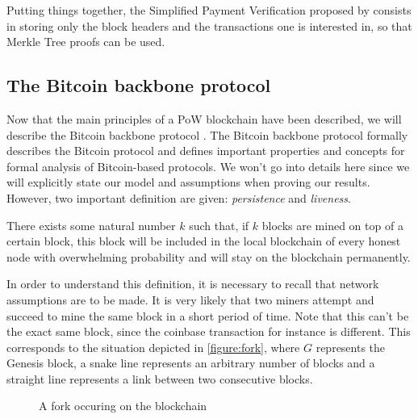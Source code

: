         Putting things together, the Simplified Payment Verification proposed by \citeauthor{Bitcoin} consists in storing only the block headers and the transactions one is interested in, so that Merkle Tree proofs can be used.

      \subsection{The Bitcoin backbone protocol}
        \label{subsec:backbone}
        Now that the main principles of a PoW blockchain have been described, we will describe the Bitcoin backbone protocol \cite{Backbone}. The Bitcoin backbone protocol formally describes the Bitcoin protocol and defines important properties and concepts for formal analysis of Bitcoin-based protocols. We won't go into details here since we will explicitly state our model and assumptions when proving our results. However, two important definition are given: \textit{persistence} and \textit{liveness}.
        
        \begin{Definition}
          There exists some natural number \(k\) such that, if \(k\) blocks are mined on top of a certain block, this block will be included in the local blockchain of every honest node with overwhelming probability and will stay on the blockchain permanently.
        \end{Definition}
        
        In order to understand this definition, it is necessary to recall that network assumptions are to be made. It is very likely that two miners attempt and succeed to mine the same block in a short period of time. Note that this can't be the exact same block, since the coinbase transaction for instance is different. This corresponds to the situation depicted in \autoref{figure:fork}, where \(G\) represents the Genesis block, a snake line represents an arbitrary number of blocks and a straight line represents a link between two consecutive blocks. 
        
        \begin{figure}[ht]
          \centering
          \caption{A fork occuring on the blockchain}
          \label{figure:fork}
        \end{figure}
        
